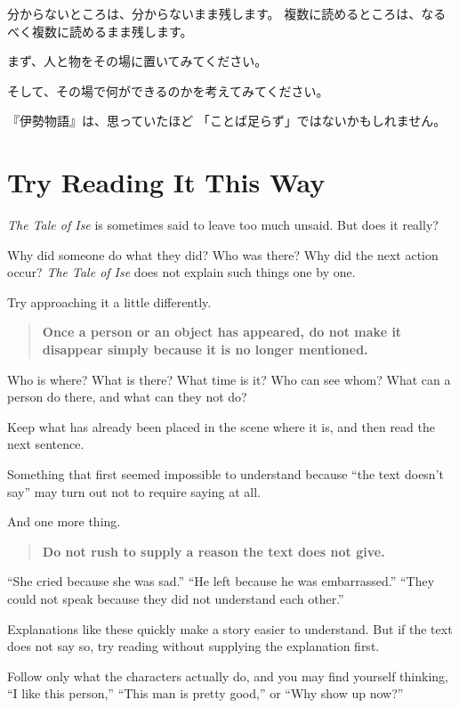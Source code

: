 分からないところは、分からないまま残します。
複数に読めるところは、なるべく複数に読めるまま残します。

まず、人と物をその場に置いてみてください。

そして、その場で何ができるのかを考えてみてください。

『伊勢物語』は、思っていたほど
「ことば足らず」ではないかもしれません。

\else

\section{Try Reading It This Way}
\label{dan:000}

\textit{The Tale of Ise} is sometimes said to leave too much unsaid.
But does it really?

Why did someone do what they did?
Who was there?
Why did the next action occur?
\textit{The Tale of Ise} does not explain such things one by one.

Try approaching it a little differently.

\begin{quote}
\textbf{Once a person or an object has appeared,
do not make it disappear simply because it is no longer mentioned.}
\end{quote}

Who is where?
What is there?
What time is it?
Who can see whom?
What can a person do there, and what can they not do?

Keep what has already been placed in the scene where it is,
and then read the next sentence.

Something that first seemed impossible to understand
because ``the text doesn't say''
may turn out not to require saying at all.

And one more thing.

\begin{quote}
\textbf{Do not rush to supply a reason the text does not give.}
\end{quote}

``She cried because she was sad.''
``He left because he was embarrassed.''
``They could not speak because they did not understand each other.''

Explanations like these quickly make a story easier to understand.
But if the text does not say so,
try reading without supplying the explanation first.

Follow only what the characters actually do,
and you may find yourself thinking,
``I like this person,''
``This man is pretty good,''
or
``Why show up now?''

